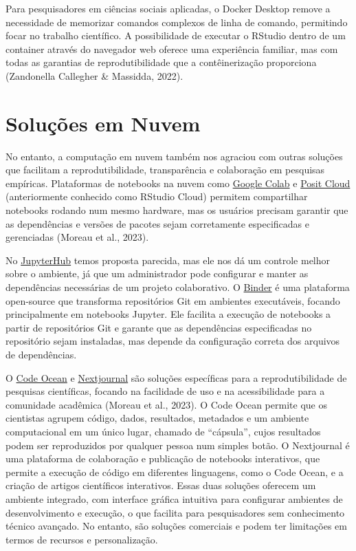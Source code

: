\documentclass[
  a4paper,
]{book}
\begin{document}
Para pesquisadores em ciências sociais aplicadas, o Docker Desktop
remove a necessidade de memorizar comandos complexos de linha de
comando, permitindo focar no trabalho científico. A possibilidade de
executar o RStudio dentro de um container através do navegador web
oferece uma experiência familiar, mas com todas as garantias de
reprodutibilidade que a contêinerização proporciona (Zandonella
Callegher \& Massidda, 2022).

\section{Soluções em Nuvem}\label{soluuxe7uxf5es-em-nuvem}

No entanto, a computação em nuvem também nos agraciou com outras
soluções que facilitam a reprodutibilidade, transparência e colaboração
em pesquisas empíricas. Plataformas de notebooks na nuvem como
\href{https://colab.research.google.com/}{Google Colab} e
\href{https://posit.cloud/}{Posit Cloud} (anteriormente conhecido como
RStudio Cloud) permitem compartilhar notebooks rodando num mesmo
hardware, mas os usuários precisam garantir que as dependências e
versões de pacotes sejam corretamente especificadas e gerenciadas
(Moreau et al., 2023).

No \href{https://jupyter.org/hub}{JupyterHub} temos proposta parecida,
mas ele nos dá um controle melhor sobre o ambiente, já que um
administrador pode configurar e manter as dependências necessárias de um
projeto colaborativo. O \href{https://mybinder.org/}{Binder} é uma
plataforma open-source que transforma repositórios Git em ambientes
executáveis, focando principalmente em notebooks Jupyter. Ele facilita a
execução de notebooks a partir de repositórios Git e garante que as
dependências especificadas no repositório sejam instaladas, mas depende
da configuração correta dos arquivos de dependências.

O \href{https://codeocean.com/}{Code Ocean} e
\href{https://nextjournal.com/}{Nextjournal} são soluções específicas
para a reprodutibilidade de pesquisas científicas, focando na facilidade
de uso e na acessibilidade para a comunidade acadêmica (Moreau et al.,
2023). O Code Ocean permite que os cientistas agrupem código, dados,
resultados, metadados e um ambiente computacional em um único lugar,
chamado de ``cápsula'', cujos resultados podem ser reproduzidos por
qualquer pessoa num simples botão. O Nextjournal é uma plataforma de
colaboração e publicação de notebooks interativos, que permite a
execução de código em diferentes linguagens, como o Code Ocean, e a
criação de artigos científicos interativos. Essas duas soluções oferecem
um ambiente integrado, com interface gráfica intuitiva para configurar
ambientes de desenvolvimento e execução, o que facilita para
pesquisadores sem conhecimento técnico avançado. No entanto, são
soluções comerciais e podem ter limitações em termos de recursos e
personalização.
\end{document}
